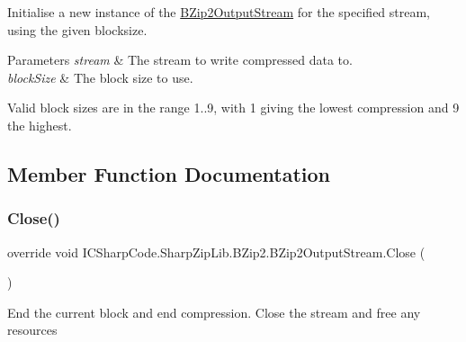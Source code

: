 Initialise a new instance of the \hyperlink{class_i_c_sharp_code_1_1_sharp_zip_lib_1_1_b_zip2_1_1_b_zip2_output_stream}{B\+Zip2\+Output\+Stream} for the specified stream, using the given blocksize. 


\begin{DoxyParams}{Parameters}
{\em stream} & The stream to write compressed data to.\\
\hline
{\em block\+Size} & The block size to use.\\
\hline
\end{DoxyParams}


Valid block sizes are in the range 1..9, with 1 giving the lowest compression and 9 the highest. 

\subsection{Member Function Documentation}
\mbox{\label{class_i_c_sharp_code_1_1_sharp_zip_lib_1_1_b_zip2_1_1_b_zip2_output_stream_a6d8efc71b181f35fc1529213a8252837}} 
\subsubsection{\texorpdfstring{Close()}{Close()}}
{\footnotesize\ttfamily override void I\+C\+Sharp\+Code.\+Sharp\+Zip\+Lib.\+B\+Zip2.\+B\+Zip2\+Output\+Stream.\+Close (\begin{DoxyParamCaption}{ }\end{DoxyParamCaption})\hspace{0.3cm}{\ttfamily [inline]}}



End the current block and end compression. Close the stream and free any resources 

\mbox{\label{class_i_c_sharp_code_1_1_sharp_zip_lib_1_1_b_zip2_1_1_b_zip2_output_stream_adb8b52993894a6d6341be078940151b0}} 
